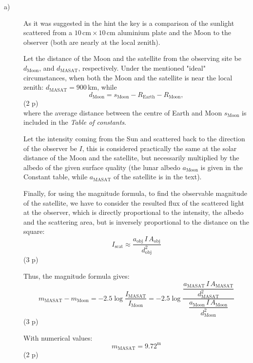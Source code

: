 \begin{description}
\item[a)] As it was suggested in the hint the key is a comparison of the
sunlight scattered from a $10\,\mathrm{cm} \times 10\,\mathrm{cm}$ aluminium
plate and the Moon to the observer (both are nearly at the local zenith).

Let the distance of the Moon and the satellite from the observing site be
$d_{\mathrm{Moon}}$, and $d_{\mathrm{MASAT}}$, respectively. Under the
mentioned "ideal" circumstances, when both the Moon and the satellite is near
the local zenith: $d_{\mathrm{MASAT}} = 900$\,km, while
\begin{equation*}
d_{\mathrm{Moon}} = s_{\mathrm{Moon}} - R_{\mathrm{Earth}}
  - R_{\mathrm{Moon}}, \tag{14.1}
\end{equation*}
\hfill(2 p)\\
where the average distance between the centre of Earth and Moon
$s_{\mathrm{Moon}}$ is included in the \emph{Table of constants}.

Let the intensity coming from the Sun and scattered back to the direction of
the observer be $I$, this is considered practically the same at the solar
distance of the Moon and the satellite, but necessarily multiplied by the
albedo of the given surface quality (the lunar albedo $a_{\mathrm{Moon}}$ is
given in the Constant table, while $a_{\mathrm{MASAT}}$ of the satellite is
in the text).

Finally, for using the magnitude formula, to find the observable magnitude of
the satellite, we have to consider the resulted flux of the scattered light
at the observer, which is directly proportional to the intensity, the albedo
and the scattering area, but is inversely proportional to the distance on the
square:
\begin{equation*}
I_{\mathrm{scat}} \approx
  \frac{a_{\mathrm{obj}}\,I\,A_{\mathrm{obj}}}{d_{\mathrm{obj}}^2}
\tag{14.2}
\end{equation*}
\hfill(3 p)

Thus, the magnitude formula gives:
\begin{equation*}
m_{\mathrm{MASAT}} - m_{\mathrm{Moon}}
  = -2.5\log\frac{I_{\mathrm{MASAT}}}{I_{\mathrm{Moon}}}
  = -2.5\log\frac{\dfrac{a_{\mathrm{MASAT}}\,I\,A_{\mathrm{MASAT}}}
      {d_{\mathrm{MASAT}}^2}}
    {\dfrac{a_{\mathrm{Moon}}\,I\,A_{\mathrm{Moon}}}{d_{\mathrm{Moon}}^2}}
\tag{14.3}
\end{equation*}
\hfill(3 p)

With numerical values:
\[ m_{\mathrm{MASAT}} = 9.72^{\mathrm{m}} \]
\hfill(2 p)


\end{description}
